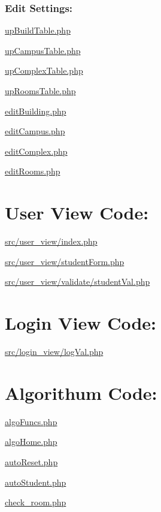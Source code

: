 \hypertarget{index_edit}{}\subsubsection{\-Edit Settings\-:}\label{index_edit}
\hyperlink{upBuildTable_8php}{up\-Build\-Table.\-php} \par
 \hyperlink{upCampusTable_8php}{up\-Campus\-Table.\-php} \par
 \hyperlink{upComplexTable_8php}{up\-Complex\-Table.\-php} \par
 \hyperlink{upRoomsTable_8php}{up\-Rooms\-Table.\-php} \par
 \hyperlink{editBuilding_8php}{edit\-Building.\-php} \par
 \hyperlink{editCampus_8php}{edit\-Campus.\-php} \par
 \hyperlink{editComplex_8php}{edit\-Complex.\-php} \par
 \hyperlink{editRooms_8php}{edit\-Rooms.\-php} \par
\hypertarget{index_user_sec}{}\section{\-User View Code\-:}\label{index_user_sec}
\hyperlink{user__view_2index_8php}{src/user\-\_\-view/index.\-php}\par
 \hyperlink{studentForm_8php}{src/user\-\_\-view/student\-Form.\-php}\par
 \hyperlink{user__view_2validate_2studentVal_8php}{src/user\-\_\-view/validate/student\-Val.\-php}\par
\hypertarget{index_login_sec}{}\section{\-Login View Code\-:}\label{index_login_sec}
\hyperlink{logVal_8php}{src/login\-\_\-view/log\-Val.\-php}\par
\hypertarget{index_Algo_sec}{}\section{\-Algorithum  Code\-:}\label{index_Algo_sec}
\hyperlink{algoFuncs_8php}{algo\-Funcs.\-php}\par
 \hyperlink{algoHome_8php}{algo\-Home.\-php}\par
 \hyperlink{autoReset_8php}{auto\-Reset.\-php}\par
 \hyperlink{autoStudent_8php}{auto\-Student.\-php}\par
 \hyperlink{check__room_8php}{check\-\_\-room.\-php}\par
 